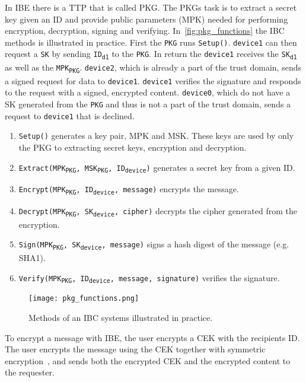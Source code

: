 In \gls{IBE} there is a \gls{TTP} that is called \gls{PKG}.
The \gls{PKG}s task is to extract a secret key given an \gls{ID} and provide public parameters (\gls{MPK}) needed for performing encryption, decryption, signing and verifying. In~\autoref{fig:pkg_functions} the \gls{IBC} methods is illustrated in practice. 
First the \texttt{PKG} runs \texttt{Setup()}. 
\texttt{device1} can then request a \texttt{SK} by sending \texttt{ID\textsubscript{d1}} to the \texttt{PKG}. 
In return the \texttt{device1} receives the \texttt{SK\textsubscript{d1}} as well as the \texttt{MPK\textsubscript{PKG}}.
\texttt{device2}, which is already a part of the trust domain, sends a signed request for \gls{data} to \texttt{device1}. 
\texttt{device1} verifies the signature and responds to the request with a signed, encrypted content.
\texttt{device0}, which do not have a \gls{SK} generated from the \texttt{PKG} and thus is not a part of the trust domain, sends a request to \texttt{device1} that is declined.

\begin{enumerate}\label{ibc-methods}
  \item \texttt{Setup()} generates a key pair, \gls{MPK} and \gls{MSK}. 
  These keys are used by only the \gls{PKG} to extracting secret keys, encryption and decryption.
  \item \texttt{Extract(MPK\textsubscript{PKG}, MSK\textsubscript{PKG}, ID\textsubscript{device})} generates a secret key from a given ID. 
  \item \texttt{Encrypt(MPK\textsubscript{PKG}, ID\textsubscript{device}, message)} encrypts the message.
  \item \texttt{Decrypt(MPK\textsubscript{PKG}, SK\textsubscript{device}, cipher)} decrypts the cipher generated from the encryption.
  \item \texttt{Sign(MPK\textsubscript{PKG}, SK\textsubscript{device}, message)} signs a hash digest of the message (e.g. \gls{SHA1}).
  \item \texttt{Verify(MPK\textsubscript{PKG}, ID\textsubscript{device}, message, signature)} verifies the signature.
\end{enumerate}

\begin{figure}[ht]
  \centering
  \texttt{[image: pkg\_functions.png]}
  \caption{Methods of an IBC systems illustrated in practice.}
  \label{fig:pkg_functions}
\end{figure}

To encrypt a message with \gls{IBE}, the user encrypts a \gls{CEK} with the recipients \gls{ID}.
The user encrypts the message using the \gls{CEK} together with symmetric encryption~\cite[section 2.2.2]{rfc5408}, and sends both the encrypted \gls{CEK} and the encrypted content to the requester. 

